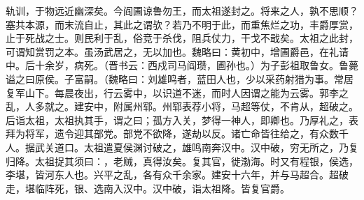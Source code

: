 轨训，于物远近幽深矣。今阎圃谅鲁勿王，而太祖遂封之。将来之人，孰不思顺？塞共本源，而末流自止，其此之谓欤？若乃不明于此，而重焦烂之功，丰爵厚赏，止于死战之士。则民利于乱，俗竞于杀伐，阻兵仗力，干戈不戢矣。太祖之此封，可谓知赏罚之本。虽汤武居之，无以加也。魏略曰：黄初中，增圃爵邑，在礼请中。后十余岁，病死。（晋书云：西戍司马阎瓒，圃孙也。）为子彭祖取鲁女。鲁薨谥之曰原侯。子富嗣。（魏略曰：刘雄鸣者，蓝田人也，少以采药射猎为事。常居复军山下。每晨夜出，行云雾中，以识道不迷，而时人因谓之能为云雾。郭李之乱，人多就之。建安中，附属州郓。州郓表荐小将，马超等仗，不肯从，超破之。后诣太祖，太祖执其手，谓之曰；孤方入关，梦得一神人，即卿也。乃厚礼之，表拜为将军，遗令迎其部党。部党不欲降，遂劫以反。诸亡命皆往给之，有众数千人。据武关道口。太祖遣夏侯渊讨破之，雄鸣南奔汉中。汉中破，穷无所之，乃复归降。太祖捉其须曰：，老贼，真得汝矣。复其官，徙渤海。时又有程银，侯选，李堪，皆河东人也。兴平之乱，各有众千余家。建安十六年，并与马超合。超破走，堪临阵死，银、选南入汉中。汉中破，诣太祖降。皆复官爵。


